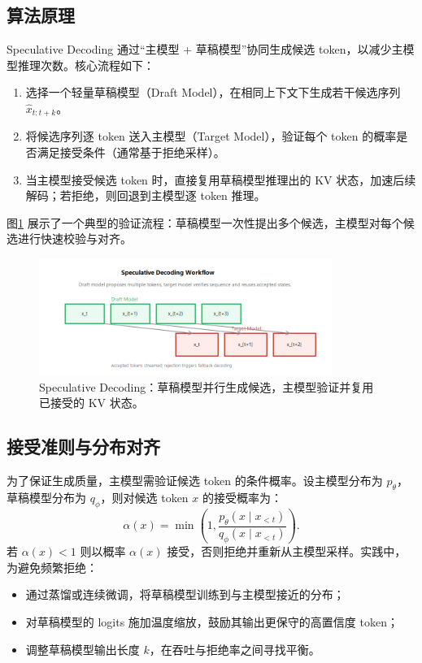 \documentclass[UTF8,zihao=-4]{ctexart}
\begin{document}
\subsection{算法原理}
Speculative Decoding 通过“主模型 + 草稿模型”协同生成候选 token，以减少主模型推理次数。核心流程如下：
\begin{enumerate}
  \item 选择一个轻量草稿模型（Draft Model），在相同上下文下生成若干候选序列 $\hat{x}_{t:t+k}$。
  \item 将候选序列逐 token 送入主模型（Target Model），验证每个 token 的概率是否满足接受条件（通常基于拒绝采样）。
  \item 当主模型接受候选 token 时，直接复用草稿模型推理出的 KV 状态，加速后续解码；若拒绝，则回退到主模型逐 token 推理。
\end{enumerate}
图\ref{fig:speculative} 展示了一个典型的验证流程：草稿模型一次性提出多个候选，主模型对每个候选进行快速校验与对齐。
\begin{figure}[H]
  \centering
  \includegraphics[width=0.85\textwidth]{speculative_decoding.png}
  \caption{Speculative Decoding：草稿模型并行生成候选，主模型验证并复用已接受的 KV 状态。}
  \label{fig:speculative}
\end{figure}

\subsection{接受准则与分布对齐}
为了保证生成质量，主模型需验证候选 token 的条件概率。设主模型分布为 $p_\theta$，草稿模型分布为 $q_\phi$，则对候选 token $x$ 的接受概率为：
\begin{equation}
  \alpha(x) = \min\left(1, \frac{p_\theta(x \mid x_{<t})}{q_\phi(x \mid x_{<t})}\right).
\end{equation}
若 $\alpha(x) < 1$ 则以概率 $\alpha(x)$ 接受，否则拒绝并重新从主模型采样。实践中，为避免频繁拒绝：
\begin{itemize}
  \item 通过蒸馏或连续微调，将草稿模型训练到与主模型接近的分布；
  \item 对草稿模型的 logits 施加温度缩放，鼓励其输出更保守的高置信度 token；
  \item 调整草稿模型输出长度 $k$，在吞吐与拒绝率之间寻找平衡。
\end{itemize}
\end{document}
